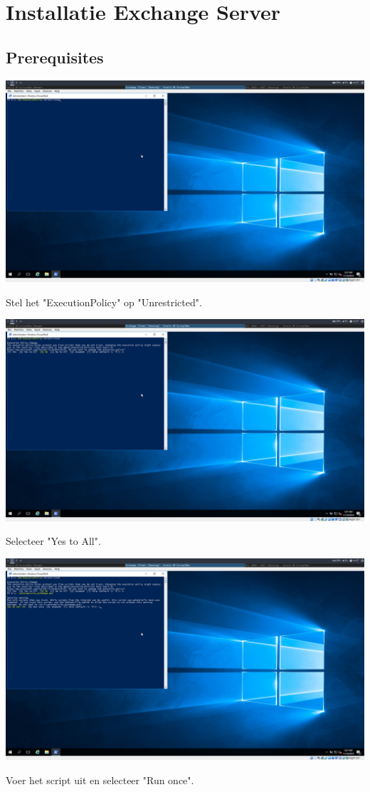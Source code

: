 \documentclass[a4paper]{article}
\begin{document}
\clearpage

\section{Installatie Exchange Server}
\subsection{Prerequisites}
	\begin{center}
	\includegraphics[width=15cm]{Pictures/Exchange/Pre/1542632844.png}
	
	Stel het "ExecutionPolicy" op "Unrestricted".
\end{center}
	\begin{center}
	\includegraphics[width=15cm]{Pictures/Exchange/Pre/1542632849.png}
	
	Selecteer "Yes to All".
\end{center}
	\begin{center}
	\includegraphics[width=15cm]{Pictures/Exchange/Pre/1542632856.png}
	
	Voer het script uit en selecteer "Run once".
\end{center}
\end{document}
